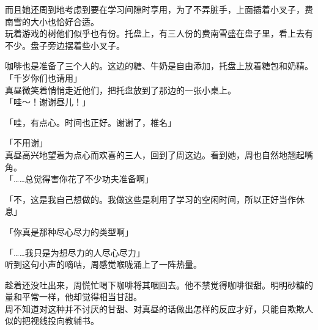 而且她还周到地考虑到要在学习间隙时享用，为了不弄脏手，上面插着小叉子，费南雪的大小也恰好合适。\\

玩着游戏的树他们似乎也有份。托盘上，有三人份的费南雪盛在盘子里，看上去有不少。盘子旁边摆着些小叉子。

咖啡也是准备了三个人的。这边的糖、牛奶是自由添加，托盘上放着糖包和奶精。\\

「千岁你们也请用」\\

真昼微笑着悄悄走近他们，把托盘放到了那边的一张小桌上。\\

「哇～！谢谢昼儿！」

「哇，有点心。时间也正好。谢谢了，椎名」

「不用谢」\\

真昼高兴地望着为点心而欢喜的三人，回到了周这边。看到她，周也自然地翘起嘴角。\\

「……总觉得害你花了不少功夫准备啊」

「不，这是我自己想做的。我做这些是利用了学习的空闲时间，所以正好当作休息」

「你真是那种尽心尽力的类型啊」

「……我只是为想尽力的人尽心尽力」\\

听到这句小声的嘀咕，周感觉喉咙涌上了一阵热量。

趁着还没吐出来，周慌忙喝下咖啡将其咽回去。他不禁觉得咖啡很甜。明明砂糖的量和平常一样，他却觉得相当甘甜。\\

周不知道对这种并不讨厌的甘甜、对真昼的话做出怎样的反应才好，只能自欺欺人似的把视线投向教辅书。

